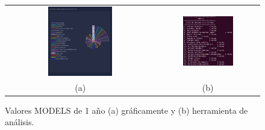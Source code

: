\documentclass[a4paper, 12pt]{book}
\begin{document}
\begin{figure}[!h]
    \centering
    \begin{tabular}{cc}
    \includegraphics[width=0.45\textwidth]{img/models_1_year_graph.png} &  
    \includegraphics[width=0.52\textwidth]{img/models_1_year.png} \\ 
    (a) &(b) 
    \end{tabular}
    \caption{Valores MODELS de 1 año (a) gráficamente y (b) herramienta de análisis.}
    \label{fig:comp_models_1_year}
\end{figure}
\end{document}
